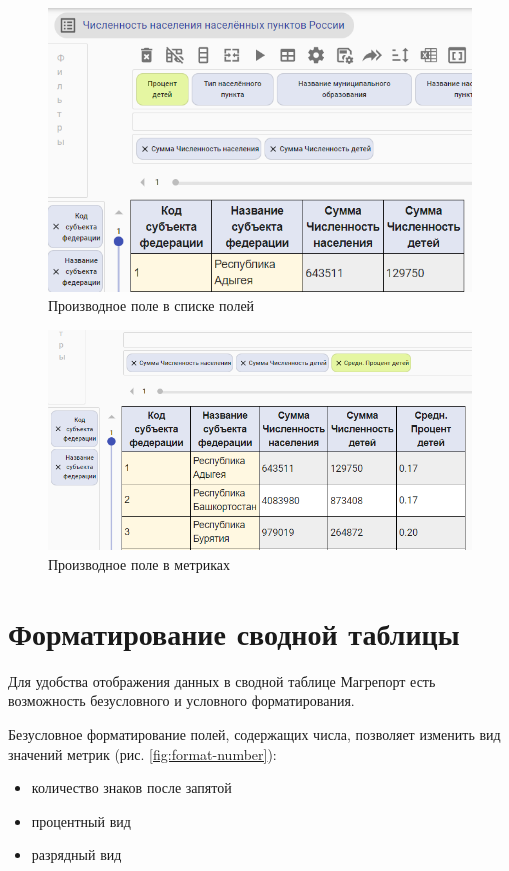 \documentclass[../user-manual.tex]{subfiles}
\begin{document}
	\begin{figure}[h]
		\centering
		\includegraphics[width=\graphicswidth]{img/9-deriver-field.png}
		\caption{Производное поле в списке полей}
		\label{fig:derived-field-2}
	\end{figure}

	\begin{figure}[h]
		\centering
		\includegraphics[width=\graphicswidth]{img/10-deriver-field.png}
		\caption{Производное поле в метриках}
		\label{fig:derived-field-3}
	\end{figure}
	
	\section{Форматирование сводной таблицы}
	
	Для удобства отображения данных в сводной таблице Магрепорт есть возможность безусловного и условного форматирования.
	
	Безусловное форматирование полей, содержащих числа, позволяет изменить вид значений метрик (рис. \ref{fig:format-number}):
	\begin{itemize}
		
		\item количество знаков после запятой
		
		\item процентный вид
		
		\item разрядный вид
	\end{itemize}
\end{document}
